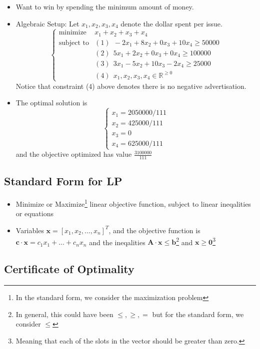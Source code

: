 \documentclass[10pt]{article}
\newcommand{\real}{\mathbb{R}}
\newcommand{\bx}{\mathbf{x}}
\begin{document}
\begin{itemize}
    \item Want to win by spending the minimum amount of money.
    \item Algebraic Setup: Let $x_1,x_2,x_3,x_4$ denote the dollar spent per issue. 
        $$
        \begin{cases}
            \text{minimize} &x_1 + x_2 + x_3 + x_4 \\
            \text{subject to} &(1)~~ -2x_1 + 8x_2 + 0x_3 + 10x_4 \geq 50000 \\
            &(2)~~5x_1 +2x_2 +0x_3 +0x_4 \geq 100000 \\
            &(3)~~ 3x_1 - 5x_2 + 10x_3 - 2x_4 \geq 25000 \\
            &(4)~~ x_1,x_2,x_3,x_4 \in \real^{\geq 0}
        \end{cases}
        $$
    Notice that constraint (4) above denotes there is no negative advertisation. 
    \item The optimal solution is 
        $$
        \begin{cases}
            x_1 = 2050000/111 \\
            x_2 = 425000/111 \\
            x_3 = 0 \\
            x_4 = 625000/111
        \end{cases}
        $$
        and the objective optimized has value $\frac{3100000}{111}$
\end{itemize}

\subsection{Standard Form for LP}
\begin{itemize}
    \item Minimize or Maximize\footnote{In the standard form, we consider the maximization problem} linear objective function, subject to linear ineqalities or equations
    \item Variables $\bx = [x_1,x_2,\dots,x_n]^T$, and the objective function is $\mathbf{c} \cdot \bx = c_1x_1 + \dots + c_nx_n$ and the ineqalities $\mathbf{A}\cdot \bx \leq \mathbf{b}$\footnote{In general, this could have been $\leq, \geq, =$ but for the standard form, we consider $\leq$} and $\bx \geq \mathbf{0}$\footnote{Meaning that each of the slots in the vector should be greater than zero.}
\end{itemize}

\subsection{Certificate of Optimality}
\end{document}
